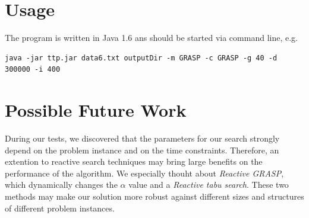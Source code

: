 \documentclass[a4paper,11pt]{article}
\begin{document}
\section{Usage}
The program is written in Java 1.6 ans should be started via command line, e.g.
\small
\lstset{language=sh}
\begin{lstlisting}
java -jar ttp.jar data6.txt outputDir -m GRASP -c GRASP -g 40 -d 300000 -i 400
\end{lstlisting}

\section{Possible Future Work}
During our tests, we discovered that the parameters for our search strongly depend on the problem instance and on the time constraints. Therefore,
an extention to reactive search techniques may bring large benefits on the performance of the algorithm. We especially thouht about \emph{Reactive GRASP},
 which dynamically changes the $\alpha$ value and a \emph{Reactive tabu search}. These two methods may make our solution more robust against different
sizes and structures of different problem instances.

\small


\end{document}
